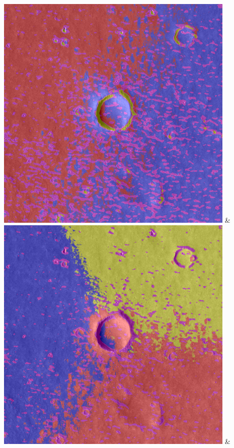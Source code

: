 \begin{table}[h!]
\begin{tabularx}{\textwidth}
		\includegraphics[width=0.9\linewidth]{images/gen/spatial_weight/p03_01.png_1.00.png} &
		\includegraphics[width=0.9\linewidth]{images/gen/spatial_weight/p03_01.png_1.33.png} &

\end{tabularx}
\end{table}
